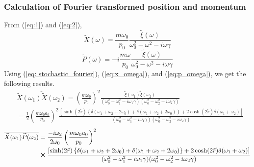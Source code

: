 \documentclass[12pt, twoside]{article}
\begin{document}
\subsubsection{Calculation of Fourier transformed position and momentum}
From (\ref{eq:1}) and (\ref{eq:2}), \begin{equation}\label{eq:x_omega}
\widetilde{X}(\omega) = \frac{m \omega_0}{p_0} \frac { \widetilde { \xi } ( \omega ) } { \omega _ { 0 } ^ { 2 } - \omega ^ { 2 } - i \omega \gamma }
\end{equation}
\begin{equation}\label{eq:p_omega}
\widetilde{P}(\omega) = -i\frac{m \omega}{p_0} \frac { \widetilde { \xi } ( \omega ) } { \omega _ { 0 } ^ { 2 } - \omega ^ { 2 } - i \omega \gamma }
\end{equation}
Using (\ref{eq: stochastic_fourier}), (\ref{eq:x_omega}), and (\ref{eq:p_omega}), we get the following results.
\begin{equation}\label{eq:x_corr_fourier}
\begin{aligned} &\overline{\widetilde { X } ( \omega_1 )\widetilde { X } ( \omega_2 )} = \left(\frac { m \omega _ { 0 } } { p _ { 0 } }\right)^2 \frac {\overline{ \widetilde { \xi } ( \omega_1 )\widetilde { \xi } ( \omega_2 ) }} {( \omega _ { 0 } ^ { 2 } - \omega_1 ^ { 2 } - i \omega_1 \gamma)(\omega _ { 0 } ^ { 2 } - \omega_2 ^ { 2 } - i \omega_2 \gamma) }
\\ & = \frac{1}{2} \left(\frac { m \omega _ { 0 } a_0 } { p _ { 0 } }\right)^2 \frac{\left[\sinh(2\tilde{r})\left\{\delta(\omega_1 + \omega_2 + 2\omega_0)+\delta(\omega_1 + \omega_2 + 2\omega_0)\right\} + 2\cosh(2\tilde{r})\delta(\omega_1 + \omega_2)\right]}{( \omega _ { 0 } ^ { 2 } - \omega_1 ^ { 2 } - i \omega_1 \gamma)(\omega _ { 0 } ^ { 2 } - \omega_2 ^ { 2 } - i \omega_2 \gamma)}
\end{aligned}
\end{equation}
\begin{equation}\begin{aligned}
\overline{\widetilde { X } ( \omega_1 )\widetilde { P } ( \omega_2 )} & = \frac{-i\omega_2}{2\omega_0} \left(\frac { m \omega_0 a_0 } { p _ { 0 } }\right)^2 \\&\cross \frac{\left[\sinh(2\tilde{r})\left\{\delta(\omega_1 + \omega_2 + 2\omega_0)+\delta(\omega_1 + \omega_2 + 2\omega_0)\right\} + 2\cosh(2\tilde{r})\delta(\omega_1 + \omega_2)\right]}{( \omega _ { 0 } ^ { 2 } - \omega_1 ^ { 2 } - i \omega_1 \gamma)(\omega _ { 0 } ^ { 2 } - \omega_2 ^ { 2 } - i \omega_2 \gamma)} \end{aligned}
\end{equation}
\end{document}
